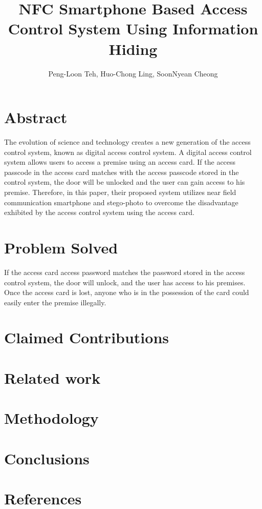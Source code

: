 \documentclass[•]{article}
\title{NFC Smartphone Based Access Control System Using Information Hiding}
\author{Peng-Loon Teh, Huo-Chong Ling, SoonNyean Cheong}
\date{}
\begin{document}
\tableofcontents
\maketitle

\section{Abstract}
The evolution of science and technology creates a new generation of the access control system, known as digital access control system. A digital access control system allows users to access a premise using an access card. If the access passcode in the access card matches with the access passcode stored in the control system, the door will be unlocked and the user can gain access to his premise. Therefore, in this paper, their proposed system utilizes near field communication smartphone and stego-photo to overcome the disadvantage exhibited by the access control system using the access card.
\section{Problem Solved}
If the access card access password matches the password stored in the access control system, the door will unlock, and the user has access to his premises.
Once the access card is lost, anyone who is in the possession of the card could easily enter the premise illegally.

\section{Claimed Contributions}

\section{Related work}

\section{Methodology}

\section{Conclusions}

\section{References}
\end{document}

